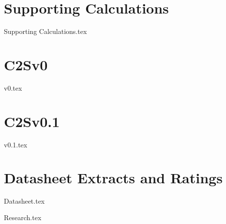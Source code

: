 \section{Supporting Calculations}
    {Supporting Calculations.tex}

\section{C2Sv0}
    {v0.tex}

\section{C2Sv0.1}
    {v0.1.tex}

\section{Datasheet Extracts and Ratings}
    {Datasheet.tex}

    {Research.tex}

\newpage \listoffigures {}
\newpage \listoftables {}